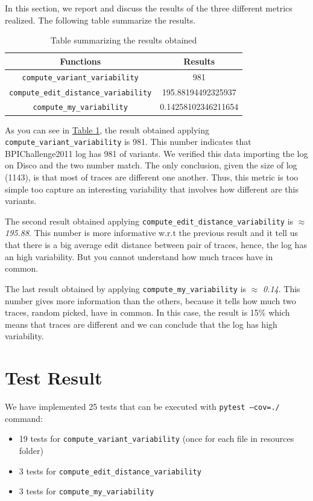 \documentclass[12pt]{article}
\begin{document}
In this section, we report and discuss the results of the three different metrics realized. The following table summarize the results.
\renewcommand{\arraystretch}{1.5}\\
\begin{table}[H]
	\centering
		\begin{tabular}{ |c|c|  }
			\hline
			\textbf{Functions} & \textbf{Results }\\
			\hline
			\texttt{compute\_variant\_variability} & 981 \\ \hline
			\texttt{compute\_edit\_distance\_variability} & 195.88194492325937 \\ \hline
			\texttt{compute\_my\_variability} & 0.14258102346211654 \\
			\hline
		\end{tabular}
	\caption{Table summarizing the results obtained}
	\label{table:results}
\end{table}

As you can see in \hyperref[table:results]{Table 1}, the result obtained applying \texttt{compute\_variant\_variability} is 981. This number indicates that BPIChallenge2011 log has 981 of variants. We verified this data importing the log on Disco and the two number match. The only conclusion, given the size of log (1143), is that most of traces are different one another. Thus, this metric is too simple too capture an interesting variability that involves how different are this variants.

\smallskip  

The second result obtained applying \texttt{compute\_edit\_distance\_variability} is $\approx$ \textit{195.88}. This number is more informative w.r.t the previous result and it tell us that there is a big average edit distance between pair of traces, hence, the log has an high variability. But you cannot understand how much traces have in common.

\smallskip

The last result obtained by applying \texttt{compute\_my\_variability} is $\approx$ \textit{0.14}. This number gives more information than the others, because it tells how much two traces, random picked, have in common. In this case, the result is 15\% which means that traces are different and we can conclude that the log has high variability.
\newpage

\section*{Test Result}
We have implemented 25 tests that can be executed with \texttt{pytest --cov=./} command:
\begin{itemize}
	\item 19 tests for \texttt{compute\_variant\_variability} (once for each file in resources folder)
	\item 3 tests for \texttt{compute\_edit\_distance\_variability}
	\item 3 tests for \texttt{compute\_my\_variability}
\end{itemize}
\end{document}
